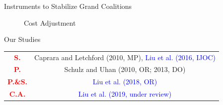 \documentclass[14pt]{beamer}
\begin{document}
\begin{frame}{Instruments to Stabilize Grand Coalitions}
\begin{figure}[H]
\begin{minipage}[t]{0.49\textwidth}
\caption*{Cost Adjustment}
\end{minipage}
\end{figure}
\end{frame}



\begin{frame}{Our Studies}
\begin{table}[t]
	\small
	\centering
	\tabcolsep=5pt
	\renewcommand\arraystretch{1.8}
	\vspace{-3mm}
	\begin{tabular}[!h]{c c}
		\hline
		\textcolor{red}{\bf S.}	&Caprara and Letchford (2010, MP), \textcolor{blue}{Liu et al. (2016, IJOC)}\\
		\textcolor{red}{\bf P.}	&Schulz and Uhan (2010, OR; 2013, DO)\\
		\textcolor{red}{\bf P.\&S.}	&\textcolor{blue}{Liu et al. (2018, OR)}\\
		\textcolor{red}{\bf C.A.}	&\textcolor{blue}{Liu et al. (2019, under review)}\\
		\hline
	\end{tabular}
	\vspace{-3mm}
\end{table}
\end{frame}
\end{document}
